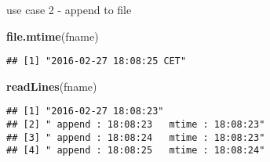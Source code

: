 \documentclass[ignorenonframetext,]{beamer}
\newenvironment{Shaded}{\begin{snugshade}}{\end{snugshade}}
\newcommand{\KeywordTok}[1]{\textcolor[rgb]{0.13,0.29,0.53}{\textbf{{#1}}}}
\newcommand{\NormalTok}[1]{{#1}}
\begin{document}
\begin{frame}[fragile]{use case 2 - append to file}

\begin{Shaded}
\begin{Highlighting}[]
\KeywordTok{file.mtime}\NormalTok{(fname)}
\end{Highlighting}
\end{Shaded}

\begin{verbatim}
## [1] "2016-02-27 18:08:25 CET"
\end{verbatim}

\begin{Shaded}
\begin{Highlighting}[]
\KeywordTok{readLines}\NormalTok{(fname)}
\end{Highlighting}
\end{Shaded}

\begin{verbatim}
## [1] "2016-02-27 18:08:23"                  
## [2] " append : 18:08:23   mtime : 18:08:23"
## [3] " append : 18:08:24   mtime : 18:08:23"
## [4] " append : 18:08:25   mtime : 18:08:24"
\end{verbatim}

\end{frame}
\end{document}
